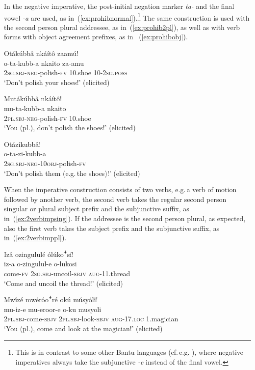 \documentclass[output=paper,colorlinks,citecolor=brown,draftmode]{langscibook}
\begin{document}
In the negative imperative, the post-initial negation marker \textit{ta-} and the final vowel \textit{-a} are used, as in~(\ref{ex:prohibnormal}).\footnote{This is in contrast to some other Bantu languages (cf.\,e.g. \citealt[101]{Harjula2004Ha}), where negative imperatives always take the subjunctive \textit{-e} instead of the final vowel.} 
The same construction is used with the second person plural addressee, as in~(\ref{ex:prohib2pl}), as well as with verb 
forms with object agreement prefixes, as in~ (\ref{ex:prohibobj}).  

\ea \begin{xlist}\label{ex:ruulietal:8}
\ex \label{ex:prohibnormal}
	\glll   Otákúbbâ nkáítô zaamú!\\ 
	        o-ta-kubb-a nkaito za-amu\\
		    \textsc{2sg.sbj}-\textsc{neg}-polish-\textsc{fv} 10.shoe 10-2\textsc{sg.poss}\\
	\glt ‘Don't polish your shoes!’ (elicited)

\ex \label{ex:prohib2pl}
	\glll   Mutákúbbâ nkáítô!\\
	        mu-ta-kubb-a nkaito\\
		    \textsc{2pl.sbj}-\textsc{neg}-polish-\textsc{fv} 10.shoe\\
	\glt ‘You (pl.), don't polish the shoes!’ (elicited)

\ex \label{ex:prohibobj}
	\glll   Otázíkubbâ!\\
	        o-ta-zi-kubb-a\\
		    \textsc{2sg.sbj}-\textsc{neg}-10\textsc{obj}-polish-\textsc{fv}\\
    \glt ‘Don't polish them (e.g.\,the shoes)!’ (elicited)

\end{xlist}
\z

When the imperative construction consists of two verbs, e.g.\,a verb of motion followed by another verb, the second verb takes the regular second person singular or plural subject prefix and the subjunctive suffix, as in~(\ref{ex:2verbimpsing}). 
If the addressee is the second person plural, as expected, also the first verb takes the subject prefix and the subjunctive suffix, as in~(\ref{ex:2verbimppl}). 

\ea \label{ex:2verbspos}
\begin{xlist}
\ex \label{ex:2verbimpsing}
	\glll  Izâ ozingululé ólúkoꜜsí!\\
	    iz-a o-zingulul-e o-lukosi\\
		come-\textsc{fv} \textsc{2sg.sbj}-uncoil-\textsc{sbjv} \textsc{aug}-11.thread\\
    \glt ‘Come and uncoil the thread!’ 	 (elicited)

\ex \label{ex:2verbimppl}
	\glll  Mwîzé mwéróoꜜré okú músyólî!\\
	        mu-iz-e mu-eroor-e 	o-ku musyoli\\
		    \textsc{2pl.sbj}-come-\textsc{sbjv} \textsc{2pl.sbj}-look-\textsc{sbjv}  \textsc{aug}-17.\textsc{loc} 1.magician\\ 
    \glt ‘You (pl.), come and look at the magician!’  (elicited)
\end{xlist}
\z
\end{document}
